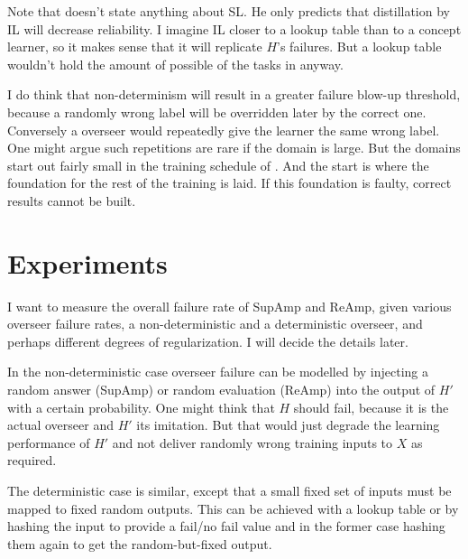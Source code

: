 \documentclass{farlamp}
\begin{document}
Note that \textcite{ChriRelAmp} doesn't state anything about SL. He only
predicts that distillation by IL will decrease reliability. I imagine IL closer
to a lookup table than to a concept learner, so it makes sense that it will
replicate $H$'s failures. But a lookup table wouldn't hold the amount of
possible of the tasks in \textcite{CSASupAmp} anyway.

I do think that non-determinism will result in a greater failure blow-up
threshold, because a randomly wrong label will be overridden later by the
correct one. Conversely a overseer would repeatedly give the learner the same
wrong label. One might argue such repetitions are rare if the domain is large.
But the domains start out fairly small in the training schedule of
\textcite{CSASupAmp}. And the start is where the foundation for the rest of the
training is laid. If this foundation is faulty, correct results cannot be built.


\section{Experiments}

I want to measure the overall failure rate of SupAmp and ReAmp, given various
overseer failure rates, a non-deterministic and a deterministic overseer, and
perhaps different degrees of regularization. I will decide the details later.

In the non-deterministic case overseer failure can be modelled by injecting a
random answer (SupAmp) or random evaluation (ReAmp) into the output of $H'$ with
a certain probability. One might think that $H$ should fail, because it is the
actual overseer and $H'$ its imitation. But that would just degrade the learning
performance of $H'$ and not deliver randomly wrong training inputs to $X$ as
required.

The deterministic case is similar, except that a small fixed set of inputs must
be mapped to fixed random outputs. This can be achieved with a lookup table or
by hashing the input to provide a fail/no fail value and in the former case
hashing them again to get the random-but-fixed output.


\printbibliography
\end{document}
